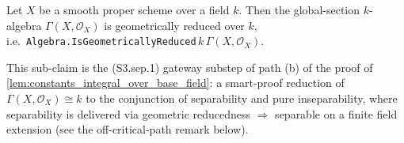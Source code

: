 \begin{lemma}

  \label{lem:S3_sep_1_smooth_geometrically_reduced_Gamma}
  Let \(X\) be a smooth proper scheme over a field \(k\). Then the global-section \(k\)-algebra \(\Gamma(X, \mathcal O_X)\) is geometrically reduced over \(k\), i.e.\ \texttt{Algebra.IsGeometricallyReduced}\,\(k\)\,\(\Gamma(X, \mathcal O_X)\).

  This sub-claim is the (S3.sep.1) gateway substep of path (b) of the proof of \cref{lem:constants_integral_over_base_field}: a smart-proof reduction of \(\Gamma(X, \mathcal O_X) \cong k\) to the conjunction of separability and pure inseparability, where separability is delivered via geometric reducedness \(\Rightarrow\) separable on a finite field extension (see the off-critical-path remark below).
\end{lemma}

